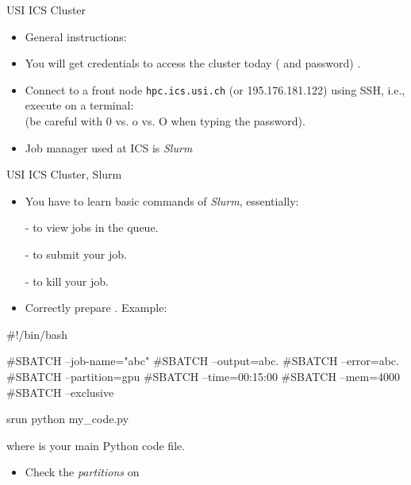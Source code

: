 \begin{frame}[fragile]{USI ICS Cluster}
\vspace{-5mm}
\begin{itemize}
\item General instructions: 
\item You will get credentials to access the cluster today ( and password) .
\item Connect to a front node \texttt{hpc.ics.usi.ch} (or 195.176.181.122) using SSH, i.e., execute on a terminal: \\
(be careful with 0 vs. o vs. O when typing the password).
\item Job manager used at ICS is \textit{Slurm}
\end{itemize}
\end{frame}

\begin{frame}[fragile]{USI ICS Cluster, Slurm}
\vspace{-5mm}
\begin{itemize}
\item You have to learn basic commands of \textit{Slurm}, essentially:
\item[-]  to view jobs in the queue.
\item[-]  to submit your job.
\item[-]  to kill your job.
\item Correctly prepare . Example: 
\end{itemize}
\begin{python}
#!/bin/bash

#SBATCH --job-name="abc"
#SBATCH --output=abc.%
#SBATCH --error=abc.%
#SBATCH --partition=gpu
#SBATCH --time=00:15:00
#SBATCH --mem=4000
#SBATCH --exclusive

srun python my_code.py
\end{python}
where  is your main Python code file.
\begin{itemize}
\item Check the \textit{partitions} on 
\end{itemize}
\end{frame}

